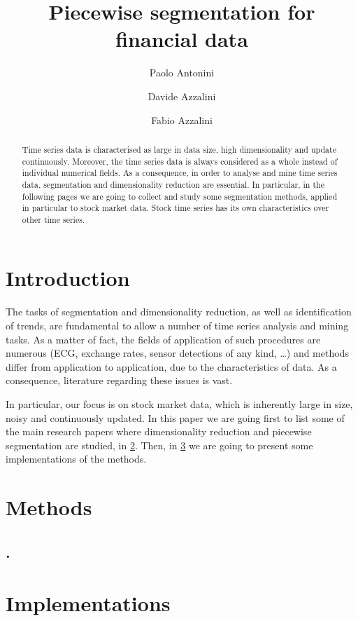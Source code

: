 \documentclass[a4paper]{article}
\title{Piecewise segmentation for financial data}
\author{Paolo Antonini \and Davide Azzalini \and Fabio Azzalini}
\date{}
\begin{document}
\maketitle

\begin{abstract}
Time series data is characterised as large in data size, high dimensionality and update continuously. Moreover, the time series data is always considered as a whole instead of individual numerical fields. As a consequence, in order to analyse and mine time series data, segmentation and dimensionality reduction are essential. In particular, in the following pages we are going to collect and study some segmentation methods, applied in particular to stock market data. Stock time series has its own characteristics over other time series. 
\end{abstract}

\section{Introduction}
The tasks of segmentation and dimensionality reduction, as well as identification of trends, are fundamental to allow a number of time series analysis and mining tasks. As a matter of fact, the fields of application of such procedures are numerous (ECG, exchange rates, sensor detections of any kind, \dots) and methods differ from application to application, due to the characteristics of data. As a consequence, literature regarding these issues is vast. 

In particular, our focus is on stock market data, which is inherently large in size, noisy and continuously updated. In this paper we are going first to list some of the main research papers where dimensionality reduction and piecewise segmentation are studied, in \cref{sec:methods}. Then, in \cref{sec:implementations} we are going to present some implementations of the methods. 


\section{Methods}\label{sec:methods}
\lipsum[1]

\subsection{\citeauthor{5961935}. }
\lipsum[2-3]


\section{Implementations}\label{sec:implementations}
\end{document}
